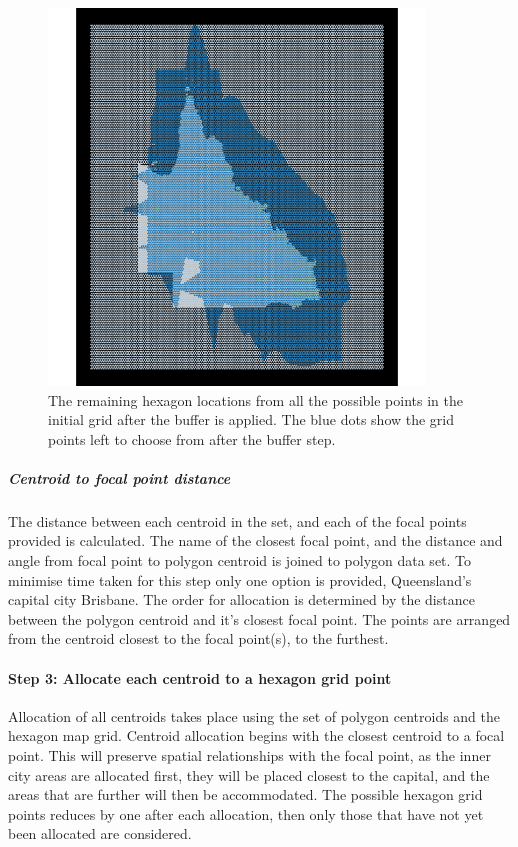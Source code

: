\begin{figure}[h]
\centering
\includegraphics[width=10cm]{figs/3grid.pdf}
\caption{\label{fig:filter-grid}The remaining hexagon locations from all the possible points in the initial grid after the buffer is applied. The blue dots show the grid points left to choose from after the buffer step.}
\end{figure}

\hypertarget{centroid-to-focal-point-distance}{%
\subparagraph{Centroid to focal point
distance}\label{centroid-to-focal-point-distance}}

The distance between each centroid in the set, and each of the focal
points provided is calculated. The name of the closest focal point, and
the distance and angle from focal point to polygon centroid is joined to
polygon data set. To minimise time taken for this step only one option
is provided, Queensland's capital city Brisbane. The order for
allocation is determined by the distance between the polygon centroid
and it's closest focal point. The points are arranged from the centroid
closest to the focal point(s), to the furthest.

\hypertarget{step-3-allocate-each-centroid-to-a-hexagon-grid-point}{%
\paragraph{Step 3: Allocate each centroid to a hexagon grid
point}\label{step-3-allocate-each-centroid-to-a-hexagon-grid-point}}

Allocation of all centroids takes place using the set of polygon
centroids and the hexagon map grid. Centroid allocation begins with the
closest centroid to a focal point. This will preserve spatial
relationships with the focal point, as the inner city areas are
allocated first, they will be placed closest to the capital, and the
areas that are further will then be accommodated. The possible hexagon
grid points reduces by one after each allocation, then only those that
have not yet been allocated are considered.


